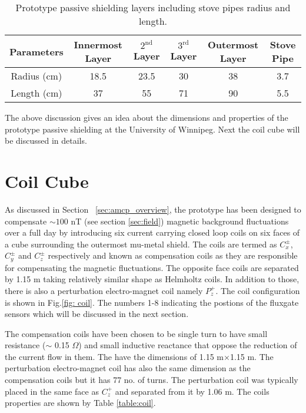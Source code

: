 \begin{table} [!htb]
    \centering
    \begin{tabular} { |c|c|c|c|c|c|} 
        \hline
        Parameters & Innermost Layer & $\mathrm{2^{nd}}$ Layer & $\mathrm{3^{rd}}$ Layer & Outermost Layer & Stove Pipe\\
        \hline\hline
        Radius (cm) & 18.5 & 23.5 & 30 & 38 & 3.7 \\ 
        \hline
        Length (cm) & 37 & 55 & 71 & 90 & 5.5 \\ 
         \hline
    \end{tabular}
    \caption{Prototype passive shielding layers including stove pipes radius and length.}\label{table:mu-metal}
\end{table}

\FloatBarrier
The above discussion gives an idea about the dimensions and properties of the prototype passive shielding at the University of Winnipeg. Next the coil cube will be discussed in details.

\section{Coil Cube}\label{sec:cube}
As discussed in Section ~\ref{sec:amcp_overview}, the prototype has been designed to compensate $\sim 100$ nT (see section \ref{sec:field}) magnetic background fluctuations over a full day by introducing six current carrying closed loop coils on six faces of a cube surrounding the outermost mu-metal shield. The coils are termed as $C_x^\pm$, $C_y^\pm$ and $C_z^\pm$ respectively and known as compensation coils as they are responsible for compensating the magnetic fluctuations. The opposite face coils are separated by 1.15 m taking relatively similar shape as  Helmholtz coils. In addition to those, there is also a perturbation electro-magnet coil namely $P_z^+$. The coil configuration is shown in Fig.\ref{fig: coil}. The numbers 1-8 indicating the postions of the fluxgate sensors which will be discussed in the next section.



\FloatBarrier
The compensation coils have been chosen to be single turn to have small resistance ($\sim$ 0.15 $\Omega$) and small inductive reactance that oppose the reduction of the current flow in them. The have the dimensions of 1.15 m$\times$1.15 m. The perturbation electro-magnet coil has also the same dimension as the compensation coils but it has 77 no. of turns. The perturbation coil was typically placed in the same face as $C_z^+$ and separated from it by 1.06 m. The coils properties are shown by Table \ref{table:coil}. 

